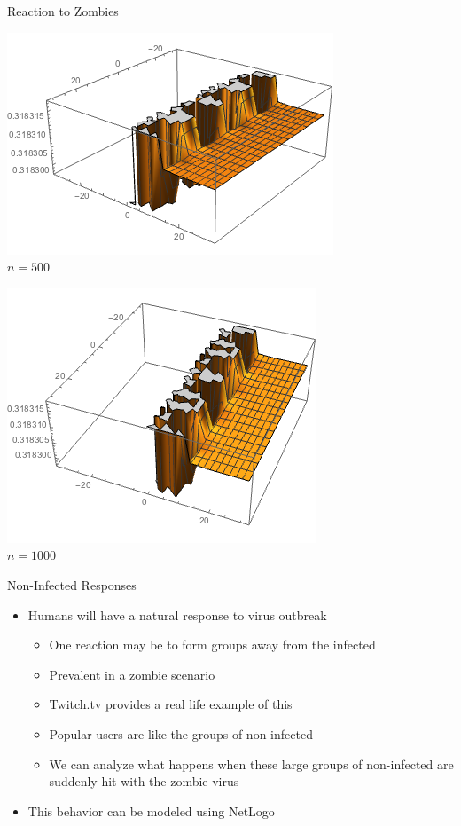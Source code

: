 \documentclass{beamer}
\begin{document}
\begin{frame}{Reaction to Zombies}
\begin{center}
\begin{minipage}{0.4\textwidth}
\pause\includegraphics[scale=0.3]{heat_03}\\
$n=500$
\end{minipage}
\begin{minipage}{0.4\textwidth}
\pause\includegraphics[scale=0.3]{heat_04}\\
$n=1000$
\end{minipage}

\end{center}
\end{frame}

\begin{frame}{Non-Infected Responses}
\begin{itemize}
\item Humans will have a natural response to virus outbreak
\pause
\begin{itemize}
\item One reaction may be to form groups away from the infected
\pause
\item Prevalent in a zombie scenario
\pause
\item Twitch.tv provides a real life example of this
\pause
\item Popular users are like the groups of non-infected
\pause
\item We can analyze what happens when these large groups of non-infected are suddenly hit with the
zombie virus
\end{itemize}
\pause
\item This behavior can be modeled using NetLogo
\end{itemize}
\end{frame}
\end{document}

